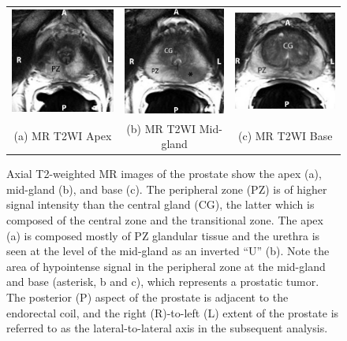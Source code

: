 \begin{figure}[htb!]
\centering
\begin{tabular}{ccc}
\includegraphics[width=0.29\linewidth]{figs/mr_anatomy/T2_apex} &
\includegraphics[width=0.275\linewidth]{figs/mr_anatomy/T2_midgland} &
\includegraphics[width=0.3\linewidth]{figs/mr_anatomy/T2_base} \\
(a) MR T2WI Apex & (b) MR T2WI Mid-gland & (c) MR T2WI Base \\
\end{tabular}
\caption{Axial T2-weighted MR images of the prostate show the apex (a),
    mid-gland (b), and base (c).  The peripheral zone (PZ) is of higher signal
    intensity than the central gland (CG), the latter which is composed of the
    central zone and the transitional zone. The apex (a) is composed mostly of
    PZ glandular tissue and the urethra is seen at the level of the mid-gland as
    an inverted ``U'' (b). Note the area of hypointense signal in the
    peripheral zone at the mid-gland and base (asterisk, b and c), which
    represents a prostatic tumor.  The posterior (P) aspect of the prostate is
    adjacent to the endorectal coil, and the right (R)-to-left (L) extent of
    the prostate is referred to as the lateral-to-lateral axis in the subsequent
    analysis.}
\label{fig:mr_anatomy} 
\end{figure}
